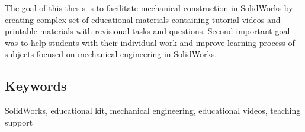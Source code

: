\documentclass{template/socthesis}
\begin{document}
The goal of this thesis is to facilitate mechanical construction in SolidWorks by creating complex set of educational materials containing tutorial videos and printable materials with revisional tasks and questions.
Second important goal was to help students with their individual work and improve learning process of subjects focused on mechanical engineering in SolidWorks. 

\subsection*{Keywords}
SolidWorks, educational kit, mechanical engineering, educational videos, teaching support

\newpage
\pagestyle{plain}

\setlength{\parskip}{0em}
\tableofcontents %

\setlength{\parskip}{0.8em}
\setcounter{figure}{0}
\setcounter{table}{0}
\newpage







\newpage

\appendix
{}



\setlength{\parskip}{0em}
\printbibliography[title=Literatura]

\listoffigures \label{listoffigures}

\end{document}
